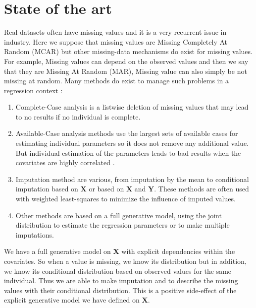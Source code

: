 \documentclass[12pt,a4paper]{report}
\begin{document}
	 \section{State of the art}
	Real datasets often have missing values and it is a very recurrent issue in industry. 
			Here we suppose that missing values are Missing Completely At Random (MCAR) but other missing-data mechanisms do exist for missing values. For example, Missing values can depend on the observed values and then we say that they are Missing At Random (MAR), Missing value can also simply be not missing at random.
	 Many methods do exist to manage such problems in a regression context \cite{little1992regression}:
	 \begin{enumerate}
	\item Complete-Case analysis is a listwise deletion of missing values that may lead to no results if no individual is complete.  	
	\item Available-Case analysis methods use the largest sets of available cases for estimating individual parameters so it does not remove any additional value. But individual estimation of the parameters leads to bad results when the covariates are highly correlated \cite{haitovsky1968missing}.
	\item Imputation method are various, from imputation by the mean to conditional imputation based on $\boldsymbol{X}$ or based on $\boldsymbol{X}$ and $\boldsymbol{Y}$. These methods are often used with weighted least-squares to minimize the influence of imputed values.
	\item Other methods are based on a full generative model, using the joint distribution to estimate the regression parameters or to make multiple imputations.
	\end{enumerate} 
%	 
%	 
	We have a full generative model on $\boldsymbol{X}$ with explicit dependencies within the covariates. So when a value is missing, we know its distribution but in addition, we know its conditional distribution based on observed values for the same individual. Thus we are able to make imputation and to describe the missing values with their conditional distribution. This is a positive side-effect of the explicit generative model we have defined on $\boldsymbol{X}$.\\
		
	
\end{document}
